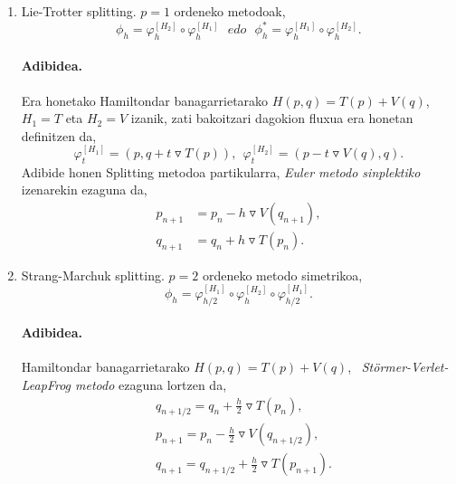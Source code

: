 \begin{enumerate}

\item Lie-Trotter splitting.
$p=1$ ordeneko metodoak,
\begin{equation}
\phi_h = \varphi_h^{[H_2]} \circ \varphi_h^{[H_1]} \ \ \ edo \ \ \ \phi_h^{*} = \varphi_h^{[H_1]} \circ \varphi_h^{[H_2]} .
\end{equation}


\paragraph*{Adibidea.}

Era honetako Hamiltondar banagarrietarako $H(p,q)=T(p)+V(q)$, $H_1=T$ eta $H_2=V$ izanik, zati bakoitzari dagokion fluxua era honetan definitzen da,
\begin{equation*}
\varphi_t^{[H_1]}=(p,q+t\triangledown T(p)), \ \ \varphi_t^{[H_2]}=(p-t\triangledown V(q),q). 
\end{equation*}
Adibide honen Splitting metodoa partikularra, \emph{Euler metodo sinplektiko} izenarekin ezaguna da,
\begin{align*}
p_{n+1}&=p_{n}-h \triangledown V(q_{n+1}), \\
q_{n+1}&=q_{n}+h \triangledown T(p_n).
\end{align*}  
   

\item Strang-Marchuk splitting.
$p=2$ ordeneko metodo simetrikoa,
\begin{equation}
\phi_h =  \varphi_{{h}/{2}}^{[H_1]} \circ \varphi_h^{[H_2]} \circ \varphi_{{h}/{2}}^{[H_1]}.
\end{equation} 

\paragraph*{Adibidea.}

Hamiltondar banagarrietarako $H(p,q)=T(p)+V(q)$, ~\emph{Störmer-Verlet-LeapFrog metodo} ezaguna lortzen da,
\begin{align*}
&q_{{n+1}/{2}} =q_n+\frac{h}{2} \triangledown T(p_n), \\
&p_{n+1} =p_n-\frac{h}{2} \triangledown V(q_{{n+1}/{2}}), \\
&q_{n+1} =q_{{n+1}/{2}}+\frac{h}{2} \triangledown T(p_{n+1}).
\end{align*}

\end{enumerate}

